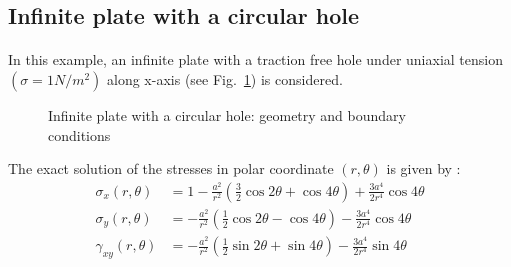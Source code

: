 \subsection{Infinite plate with a circular hole}
\paragraph{}
In this example, an infinite plate with a traction free hole under uniaxial tension $(\sigma = 1 N/m^2 )$
along x-axis (see Fig.~\ref{iso_fig:circular_hole_geo_bc}) is considered.

    \begin{figure}[h!]
        \centering
        \caption{ Infinite plate with a circular hole: geometry and boundary conditions}
        \label{iso_fig:circular_hole_geo_bc}
    \end{figure}
%
The exact solution of the stresses in polar coordinate $(r,\theta)$ is given by \citep{Sukumar2001}:
    \begin{subequations}
        \begin{align}
            \sigma_{x}(r,\theta) &= 1 - \frac{a^2}{r^2} \left(
                \frac{3}{2} \cos2\theta +
                \cos4\theta
            \right) +
            \frac{3a^4}{2r^4} \cos4\theta\\
            \sigma_{y}(r,\theta) &= -\frac{a^2}{r^2} \left(
                \frac{1}{2} \cos2\theta -
                \cos4\theta
            \right) -
            \frac{3a^4}{2r^4} \cos4\theta\\
            \gamma_{xy}(r,\theta) &= -\frac{a^2}{r^2} \left(
                \frac{1}{2} \sin2\theta +
                \sin4\theta
            \right) -
            \frac{3a^4}{2r^4} \sin4\theta
        \end{align}
        \label{iso_eq:ex_chole_stress_sol}
    \end{subequations}
